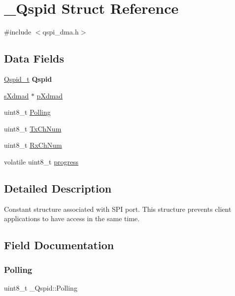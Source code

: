 \hypertarget{struct__Qspid}{}\section{\+\_\+\+Qspid Struct Reference}
\label{struct__Qspid}


{\ttfamily \#include $<$qspi\+\_\+dma.\+h$>$}

\subsection*{Data Fields}
\begin{DoxyCompactItemize}
\item 
\mbox{\label{struct__Qspid_a1f32d747a8729936c62d5d1179be5cc2}} 
\mbox{\hyperlink{structQspid__t}{Qspid\+\_\+t}} {\bfseries Qspid}
\item 
\mbox{\hyperlink{group__dmad__structs_gaf2c13151514615a6beb35c0d868a5053}{s\+Xdmad}} $\ast$ \mbox{\hyperlink{struct__Qspid_af9ef5832dfe4e497b557fbf2f28ca4ef}{p\+Xdmad}}
\item 
uint8\+\_\+t \mbox{\hyperlink{struct__Qspid_a9096bb758013cf97d4d2821879fc6eff}{Polling}}
\item 
uint8\+\_\+t \mbox{\hyperlink{struct__Qspid_a238ab5f7d44fac7f416fe3118ee71a68}{Tx\+Ch\+Num}}
\item 
uint8\+\_\+t \mbox{\hyperlink{struct__Qspid_af9f0c7a2b41e938ff93a68afb0687afe}{Rx\+Ch\+Num}}
\item 
volatile uint8\+\_\+t \mbox{\hyperlink{struct__Qspid_a210659a187b30298fb48d780d213ea5b}{progress}}
\end{DoxyCompactItemize}


\subsection{Detailed Description}
Constant structure associated with S\+PI port. This structure prevents client applications to have access in the same time. 

\subsection{Field Documentation}
\mbox{\label{struct__Qspid_a9096bb758013cf97d4d2821879fc6eff}} 
\subsubsection{\texorpdfstring{Polling}{Polling}}
{\footnotesize\ttfamily uint8\+\_\+t \+\_\+\+Qspid\+::\+Polling}

